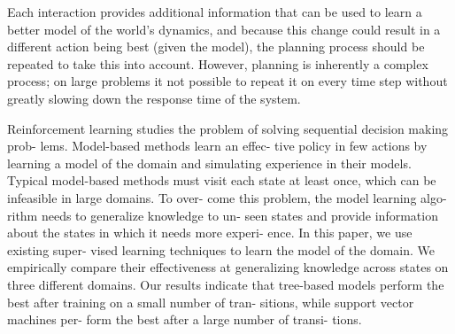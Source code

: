 Each interaction provides additional
information that can be used to learn a better model of the
world’s dynamics, and because this change could result in a
different action being best (given the model), the planning
process should be repeated to take this into account. However,
planning is inherently a complex process; on large
problems it not possible to repeat it on every time step without
greatly slowing down the response time of the system.


Reinforcement learning studies the problem
of solving sequential decision making prob-
lems. Model-based methods learn an effec-
tive policy in few actions by learning a model
of the domain and simulating experience in
their models. Typical model-based methods
must visit each state at least once, which
can be infeasible in large domains. To over-
come this problem, the model learning algo-
rithm needs to generalize knowledge to un-
seen states and provide information about
the states in which it needs more experi-
ence. In this paper, we use existing super-
vised learning techniques to learn the model
of the domain. We empirically compare their
effectiveness at generalizing knowledge across
states on three different domains. Our results
indicate that tree-based models perform the
best after training on a small number of tran-
sitions, while support vector machines per-
form the best after a large number of transi-
tions.


